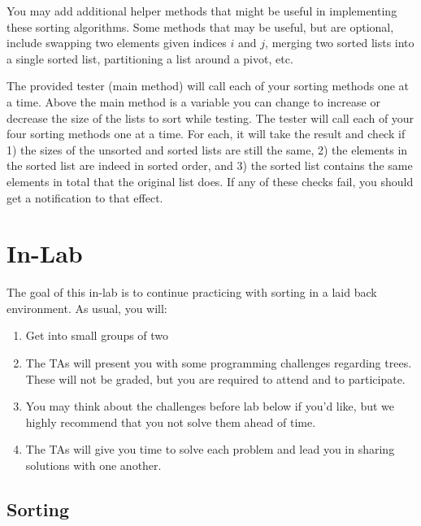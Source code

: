 \documentclass[paper=a4, fontsize=11pt, parskip=full]{scrartcl} %
\numberwithin{equation}{section} %
\numberwithin{figure}{section} %
\numberwithin{table}{section} %
\begin{document}
You may add additional helper methods that might be useful in implementing these sorting algorithms. Some methods that may be useful, but are optional, include swapping two elements given indices $i$ and $j$, merging two sorted lists into a single sorted list, partitioning a list around a pivot, etc. 

The provided tester (main method) will call each of your sorting methods one at a time. Above the main method is a variable you can change to increase or decrease the size of the lists to sort while testing. The tester will call each of your four sorting methods one at a time. For each, it will take the result and check if 1) the sizes of the unsorted and sorted lists are still the same, 2) the elements in the sorted list are indeed in sorted order, and 3) the sorted list contains the same elements in total that the original list does. If any of these checks fail, you should get a notification to that effect.



\newpage
\section{In-Lab}

The goal of this in-lab is to continue practicing with sorting in a laid back environment. As usual, you will:

\begin{enumerate}
	\item Get into small groups of two
	\item The TAs will present you with some programming challenges regarding trees. These will not be graded, but you are required to attend and to participate.
	\item You may think about the challenges before lab below if you'd like, but we highly recommend that you not solve them ahead of time.
	\item The TAs will give you time to solve each problem and lead you in sharing solutions with one another.
\end{enumerate}

\subsection{Sorting}
\end{document}
